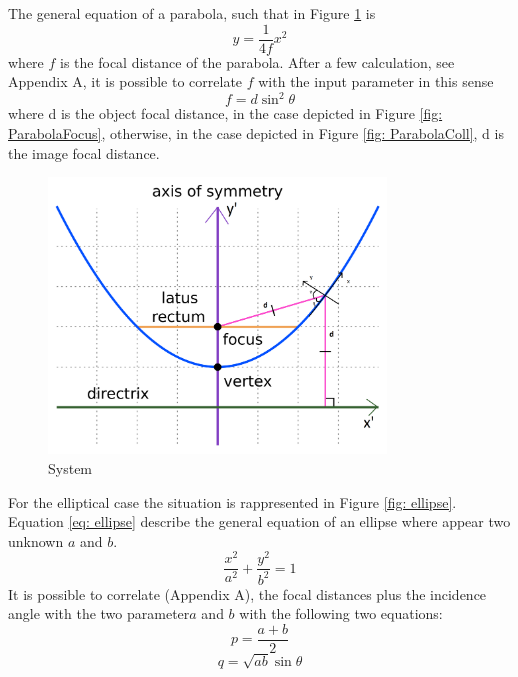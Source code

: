 The general equation of a parabola, such that in  Figure \ref{fig: ParabolaSystem} is
%
\begin{equation}
y = \frac{1}{4f} x^2
\label{eq: parabola}
\end{equation}
%
where $f $ is the focal distance of the parabola. After a few calculation, see Appendix A, it is possible to correlate $f $ with the input parameter in this sense
%
\begin{equation}
f = d \sin^2 \theta
\label{eq: parabola2}
\end{equation}
%
where d is the object focal distance, in the case depicted in Figure \ref{fig: ParabolaFocus}, otherwise, in the case depicted in Figure \ref{fig: ParabolaColl}, d is the image focal distance.
%
\begin{figure}[H]
%
\centering
%
\includegraphics[width=0.8\textwidth]{Immagini/Chapter3/Parab}
%
\caption{System}
%
\label{fig: ParabolaSystem}
%
\end{figure}
For the elliptical case the situation is rappresented in Figure \ref{fig: ellipse}. Equation \ref{eq: ellipse} describe the general equation of an ellipse where appear two unknown $a$ and $b $.
%
\begin{equation}
\frac{x^2}{a^2} + \frac{y^2}{b^2} = 1
\label{eq: ellipse}
\end{equation}
%
It is possible to correlate (Appendix A), the focal distances plus the incidence angle with the two parameter$a$ and $b $ with the following two equations:
%
\begin{equation}
p = \frac{a + b}{2}
\label{eq: 1stEllipseEq}
\end{equation}
%
\begin{equation}
q = \sqrt{ab} \sin\theta
\label{eq: 2ndEllipseEq}
\end{equation}
